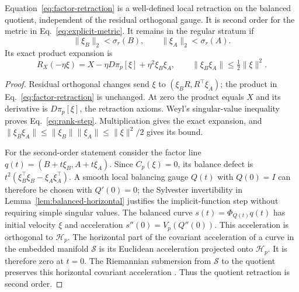 \begin{proposition}
\label{prop:second-order-retraction}
Equation~\eqref{eq:factor-retraction} is a well-defined local retraction
on the balanced quotient, independent of the residual orthogonal gauge.
It is second order for the metric in Eq.~\eqref{eq:explicit-metric}.
It remains in the regular stratum if
\begin{equation}
 \|\xi_B\|_2<\sigma_r(B),\qquad
 \|\xi_A\|_2<\sigma_r(A).
 \label{eq:rank-step}
\end{equation}
Its exact product expansion is
\begin{equation}
 R_X(-\eta\xi)=X-\eta D\pi_p[\xi]+\eta^2\xi_B\xi_A,
 \qquad \|\xi_B\xi_A\|\leq\tfrac12\|\xi\|^2.
 \label{eq:exact-retraction}
\end{equation}
\end{proposition}
\begin{proof}
Residual orthogonal changes send $\xi$ to $(\xi_BR,R^\top\xi_A)$;
the product in Eq.~\eqref{eq:factor-retraction} is unchanged. At zero
the product equals $X$ and its derivative is $D\pi_p[\xi]$, the
retraction axioms. Weyl's singular-value inequality proves
Eq.~\eqref{eq:rank-step}. Multiplication gives the exact expansion, and
$\|\xi_B\xi_A\|\leq\|\xi_B\|\|\xi_A\|\leq\|\xi\|^2/2$ gives its bound.

For the second-order statement consider the factor line
$q(t)=(B+t\xi_B,A+t\xi_A)$. Since $C_p(\xi)=0$, its balance defect is
$t^2(\xi_B^\top\xi_B-\xi_A\xi_A^\top)$. A smooth local balancing gauge
$Q(t)$ with $Q(0)=I$ can therefore be chosen with $Q'(0)=0$;
the Sylvester invertibility in Lemma~\ref{lem:balanced-horizontal}
justifies the implicit-function step without requiring simple singular
values. The balanced curve $s(t)=\Phi_{Q(t)}q(t)$ has initial velocity
$\xi$ and acceleration $s''(0)=V_p(Q''(0))$. This acceleration is
orthogonal to $\mathcal H_p$. The horizontal part of the covariant
acceleration of a curve in the embedded manifold $\mathcal S$ is its
Euclidean acceleration projected onto $\mathcal H_p$. It is therefore
zero at $t=0$. The Riemannian submersion from $\mathcal S$ to the quotient
preserves this horizontal covariant acceleration
\cite{boumal2023introduction}. Thus the quotient retraction is second order.
\end{proof}


